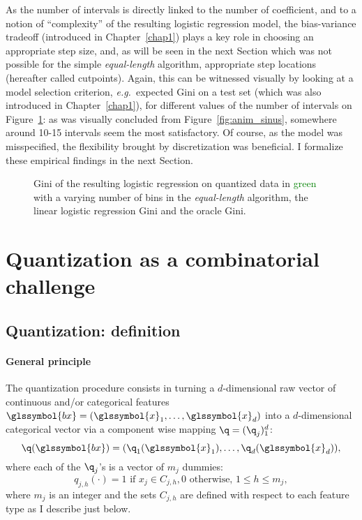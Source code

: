 As the number of intervals is directly linked to the number of coefficient, and to a notion of ``complexity'' of the resulting logistic regression model, the bias-variance tradeoff (introduced in Chapter~\ref{chap1}) plays a key role in choosing an appropriate step size, and, as will be seen in the next Section which was not possible for the simple \textit{equal-length} algorithm, appropriate step locations (hereafter called cutpoints). Again, this can be witnessed visually by looking at a model selection criterion, \textit{e.g.}\ expected Gini on a test set (which was also introduced in Chapter~\ref{chap1}), for different values of the number of intervals on Figure~\ref{fig:bic_sin}: as was visually concluded from Figure~\ref{fig:anim_sinus}, somewhere around 10-15 intervals seem the most satisfactory. Of course, as the model was misspecified, the flexibility brought by discretization was beneficial. 
I formalize these empirical findings in the next Section.



\begin{figure}
\resizebox{\textwidth}{7cm}{}
\caption{\label{fig:bic_sin} Gini of the resulting logistic regression on quantized data in \textcolor{green}{green} with a varying number of bins in the \textit{equal-length} algorithm, the linear logistic regression Gini and the oracle Gini.}
\end{figure}


 
\section{Quantization as a combinatorial challenge} \label{sec:model_selection}

\subsection{Quantization: definition}

\paragraph{General principle}

The quantization procedure consists in turning a $d$-dimensional raw vector of continuous and/or categorical features $\glssymbol{bx} = (\glssymbol{x}_1, \ldots, \glssymbol{x}_d)$ into a $d$-dimensional categorical vector via a component wise mapping $\q=(\q_j)_1^d$:
\[\q(\glssymbol{bx})=(\q_1(\glssymbol{x}_1),\ldots,\q_d(\glssymbol{x}_d)),\]
where each of the $\q_j$'s is a vector of $m_j$ dummies: 
\begin{equation}\label{eq:qj}
q_{j,h}(\cdot) =  1 \text{ if } x_j \in C_{j,h}, 0 \text{ otherwise, } 1 \leq h \leq m_j,
\end{equation}
where $m_j$ is an integer and the sets $C_{j,h}$ are defined with respect to each feature type as I describe just below.
